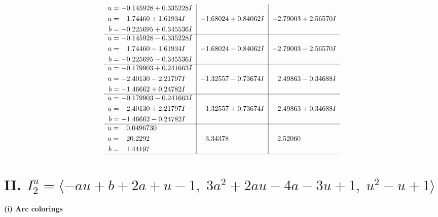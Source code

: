 \documentclass[1p]{elsarticle_modified}
\theoremstyle{definition}
\begin{document}
$$\begin{array}{c|c|c}
\begin{aligned}
u &= -0.145928 + 0.335228 I \\
a &= \phantom{-}1.74460 + 1.61934 I \\
b &= -0.225695 + 0.345536 I\end{aligned}
 & -1.68024 + 0.84062 I & -2.79003 + 2.56570 I \\ \hline\begin{aligned}
u &= -0.145928 - 0.335228 I \\
a &= \phantom{-}1.74460 - 1.61934 I \\
b &= -0.225695 - 0.345536 I\end{aligned}
 & -1.68024 - 0.84062 I & -2.79003 - 2.56570 I \\ \hline\begin{aligned}
u &= -0.179903 + 0.241663 I \\
a &= -2.40130 - 2.21797 I \\
b &= -1.46662 + 0.24782 I\end{aligned}
 & -1.32557 - 0.73674 I & \phantom{-}2.49863 - 0.34688 I \\ \hline\begin{aligned}
u &= -0.179903 - 0.241663 I \\
a &= -2.40130 + 2.21797 I \\
b &= -1.46662 - 0.24782 I\end{aligned}
 & -1.32557 + 0.73674 I & \phantom{-}2.49863 + 0.34688 I \\ \hline\begin{aligned}
u &= \phantom{-}0.0496730\phantom{ +0.000000I} \\
a &= \phantom{-}20.2292\phantom{ +0.000000I} \\
b &= \phantom{-}1.44197\phantom{ +0.000000I}\end{aligned}
 & \phantom{-}3.34378\phantom{ +0.000000I} & \phantom{-}2.52060\phantom{ +0.000000I}\\
 \hline 
 \end{array}$$\newpage\newpage\renewcommand{\arraystretch}{1}
\centering \section*{II. $I^u_{2}= \langle - a u+b+2 a+u-1,\;3 a^2+2 a u-4 a-3 u+1,\;u^2- u+1 \rangle$}
\flushleft \textbf{(i) Arc colorings}\\
\end{document}
